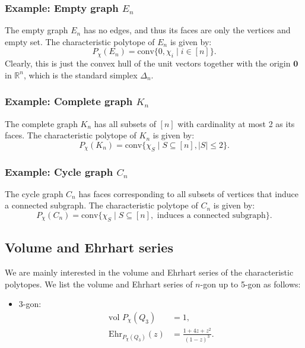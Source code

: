 \documentclass[12pt]{article}
\theoremstyle{definition}
\numberwithin{equation}{subsection}
\begin{document}
\subsubsection{Example: Empty graph $E_n$}
The empty graph $E_n$ has no edges, and thus its faces are only the vertices and empty set. The characteristic polytope of $E_n$ is given by:
\[P_{\chi}(E_n) = \text{conv} \{0, \chi_i \mid i \in [n]\}.\]
Clearly, this is just the convex hull of the unit vectors together with the origin $\textbf{0}$ in $\mathbb{R}^n$, which is the standard simplex $\Delta_{n}$.

\subsubsection{Example: Complete graph $K_n$}
The complete graph $K_n$ has all subsets of $[n]$ with cardinality at most 2 as its faces. The characteristic polytope of $K_n$ is given by:
\[P_{\chi}(K_n) = \text{conv} \{\chi_S \mid S \subseteq [n], |S| \le 2 \}.\]

\subsubsection{Example: Cycle graph $C_n$}
The cycle graph $C_n$ has faces corresponding to all subsets of vertices that induce a connected subgraph. The characteristic polytope of $C_n$ is given by:
\[P_{\chi}(C_n) = \text{conv} \{\chi_S \mid S \subseteq [n], \text{ induces a connected subgraph}\}.\]

\subsection{Volume and Ehrhart series}
We are mainly interested in the volume and Ehrhart series of the characteristic polytopes. We list the volume and Ehrhart series of $n$-gon up to 5-gon as follows:
\begin{itemize}
    \item 3-gon: 
    \begin{align*}
    \text{vol }P_{\chi}(Q_3) &= 1, \\
    \text{Ehr}_{P_{\chi}(Q_3)}(z) &= \frac{1 + 4z + z^2}{(1 - z)^3}.
    \end{align*}
\end{itemize}
\end{document}
